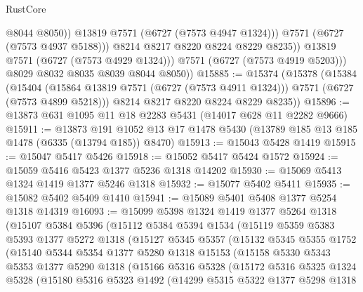 \begin{lexlean}{RustCore}
\begin{coremodule}
                        @8044
                        @8050))
                    @13819
                    @7571
                    (@6727 (@7573 @4947 @1324)))
                  @7571
                  (@6727 (@7573 @4937 @5188)))
                @8214
                @8217
                @8220
                @8224
                @8229
                @8235))
            @13819
            @7571
            (@6727 (@7573 @4929 @1324)))
          @7571
          (@6727 (@7573 @4919 @5203)))
        @8029
        @8032
        @8035
        @8039
        @8044
        @8050))
@15885 := @15374
    (@15378
      (@15384
        (@15404 (@15864 @13819 @7571 (@6727 (@7573 @4911 @1324))) @7571 (@6727 (@7573 @4899 @5218)))
        @8214
        @8217
        @8220
        @8224
        @8229
        @8235))
@15896 := @13873 @631 @1095 @11 @18 @2283 @5431 (@14017 @628 @11 @2282 @9666)
@15911 := @13873
    @191
    @1052
    @13
    @17
    @1478
    @5430
    (@13789 @185 @13 @185 @1478 (@6335 (@13794 @185)) @8470)
@15913 := @15043 @5428 @1419
@15915 := @15047 @5417 @5426
@15918 := @15052 @5417 @5424 @1572
@15924 := @15059 @5416 @5423 @1377 @5236 @1318 @14202
@15930 := @15069 @5413 @1324 @1419 @1377 @5246 @1318
@15932 := @15077 @5402 @5411
@15935 := @15082 @5402 @5409 @1410
@15941 := @15089 @5401 @5408 @1377 @5254 @1318 @14319
@16093 := @15099
    @5398
    @1324
    @1419
    @1377
    @5264
    @1318
    (@15107
      @5384
      @5396
      (@15112
        @5384
        @5394
        @1534
        (@15119
          @5359
          @5383
          @5393
          @1377
          @5272
          @1318
          (@15127
            @5345
            @5357
            (@15132
              @5345
              @5355
              @1752
              (@15140
                @5344
                @5354
                @1377
                @5280
                @1318
                @15153
                (@15158
                  @5330
                  @5343
                  @5353
                  @1377
                  @5290
                  @1318
                  (@15166
                    @5316
                    @5328
                    (@15172
                      @5316
                      @5325
                      @1324
                      @5328
                      (@15180
                        @5316
                        @5323
                        @1492
                        (@14299
                          @5315
                          @5322
                          @1377
                          @5298
                          @1318

\end{coremodule}
\end{lexlean}
